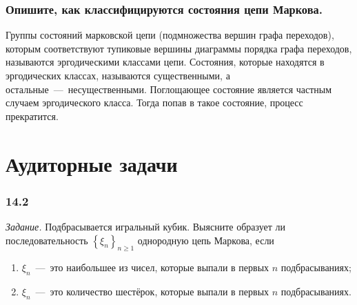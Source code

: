 \subsubsection*{Опишите, как классифицируются состояния цепи Маркова.}

Группы состояний марковской цепи (подмножества вершин графа переходов),
которым соответствуют тупиковые вершины диаграммы порядка графа переходов,
называются эргодическими классами цепи.
Состояния, которые находятся в эргодических классах, называются существенными,
а остальные~---~несущественными.
Поглощающее состояние является частным случаем эргодического класса.
Тогда попав в такое состояние, процесс прекратится.

\section*{Аудиторные задачи}

\subsubsection*{14.2}

\textit{Задание.}
Подбрасывается игральный кубик.
Выясните
образует ли последовательность $ \left\{ \xi_n \right\}_{n \geq 1}$ однородную цепь Маркова, если
\begin{enumerate}[label=\alph*)]
  \item $ \xi_n$~---~это наибольшее из чисел, которые выпали в первых $n$ подбрасываниях;
  \item $ \xi_n$~---~это количество шестёрок, которые выпали в первых $n$ подбрасываниях.
\end{enumerate}

